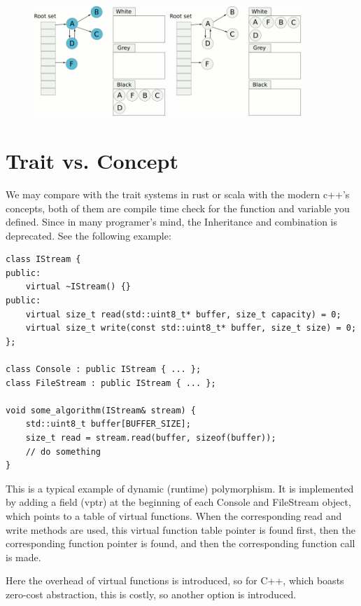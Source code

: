 \documentclass[a4paper]{exam}
\theoremstyle{definition}
\begin{document}
\begin{figure}[htbp]
  \includegraphics[width=5cm]{./img/tri_6.png}
  \includegraphics[width=5cm]{./img/tri_7.png}
\end{figure}
\section{Trait vs. Concept}
We may compare with the trait systems in rust or scala with the modern c++'s concepts, both of them are compile time check for the function and variable you defined. Since in many programer's mind, the Inheritance and combination is deprecated. See the following example:
\begin{verbatim}
class IStream {
public:
    virtual ~IStream() {}
public:
    virtual size_t read(std::uint8_t* buffer, size_t capacity) = 0;
    virtual size_t write(const std::uint8_t* buffer, size_t size) = 0;
};

class Console : public IStream { ... };
class FileStream : public IStream { ... };

void some_algorithm(IStream& stream) {
    std::uint8_t buffer[BUFFER_SIZE];
    size_t read = stream.read(buffer, sizeof(buffer));
    // do something
}
\end{verbatim}
This is a typical example of dynamic (runtime) polymorphism. It is implemented by adding a field (vptr) at the beginning of each Console and FileStream object, which points to a table of virtual functions. When the corresponding read and write methods are used, this virtual function table pointer is found first, then the corresponding function pointer is found, and then the corresponding function call is made.

Here the overhead of virtual functions is introduced, so for C++, which boasts zero-cost abstraction, this is costly, so another option is introduced.
\end{document}
